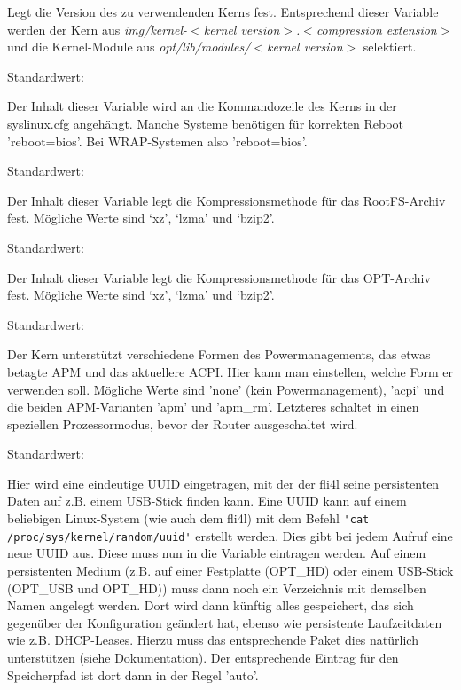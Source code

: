 \begin{description}

  Legt die Version des zu verwendenden Kerns fest. Entsprechend dieser
  Variable werden der Kern aus \emph{img/kernel-$<$kernel
  version$>$.$<$compression extension$>$} und die Kernel-Module aus 
  \emph{opt/lib/modules/$<$kernel version$>$} selektiert.


  Standardwert: 
  
  Der Inhalt dieser Variable wird an die Kommandozeile des Kerns in
  der syslinux.cfg angehängt.
  Manche Systeme benötigen für korrekten Reboot 'reboot=bios'.
  Bei WRAP-Systemen also 'reboot=bios'.


  Standardwert: 
  
  Der Inhalt dieser Variable legt die Kompressionsmethode für das RootFS-Archiv
  fest. Mögliche Werte sind `xz', `lzma' und `bzip2'.


  Standardwert: 
  
  Der Inhalt dieser Variable legt die Kompressionsmethode für das OPT-Archiv
  fest. Mögliche Werte sind `xz', `lzma' und `bzip2'.

  
    Standardwert: 
     
    {Der Kern unterstützt verschiedene Formen des Powermanagements, das etwas betagte APM 
    und das aktuellere ACPI. Hier kann man einstellen, welche Form er verwenden soll. 
    Mögliche Werte sind 'none' (kein Powermanagement), 'acpi' und die beiden APM-Varianten 
    'apm' und 'apm\_rm'. Letzteres schaltet in einen speziellen Prozessormodus, bevor der 
    Router ausgeschaltet wird. }

  
    Standardwert: 
    
    {Hier wird eine eindeutige UUID eingetragen, mit der der fli4l seine persistenten Daten 
    auf z.B. einem USB-Stick finden kann. Eine UUID kann auf einem beliebigen Linux-System
    (wie auch dem fli4l) mit dem Befehl \verb*?'cat /proc/sys/kernel/random/uuid'? erstellt werden.
    Dies gibt bei jedem Aufruf eine neue UUID aus. Diese muss nun in die Variable eintragen
    werden. Auf einem persistenten Medium (z.B. auf einer Festplatte (OPT\_HD) oder einem
    USB-Stick (OPT\_USB und OPT\_HD)) muss dann noch ein Verzeichnis mit demselben Namen 
    angelegt werden. Dort wird dann künftig alles gespeichert, das sich gegenüber der
    Konfiguration geändert hat, ebenso wie persistente Laufzeitdaten wie z.B. DHCP-Leases.
    Hierzu muss das entsprechende Paket dies natürlich unterstützen (siehe Dokumentation).
    Der entsprechende Eintrag für den Speicherpfad ist dort dann in der Regel 'auto'.

}
\end{description}
